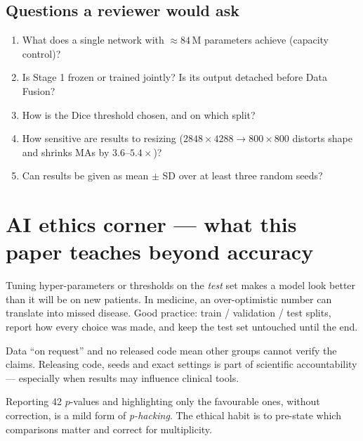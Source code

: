 \documentclass[11pt,a4paper]{article}
\begin{document}
\subsection{Questions a reviewer would ask}
\begin{enumerate}
\item What does a single network with $\approx84$\,M parameters achieve (capacity control)?
\item Is Stage 1 frozen or trained jointly? Is its output detached before Data Fusion?
\item How is the Dice threshold chosen, and on which split?
\item How sensitive are results to resizing ($2848\times4288\rightarrow800\times800$ distorts shape and
      shrinks MAs by $3.6$--$5.4\times$)?
\item Can results be given as mean $\pm$ SD over at least three random seeds?
\end{enumerate}

\section{AI ethics corner --- what this paper teaches beyond accuracy}
\begin{ethics}
Tuning hyper-parameters or thresholds on the \emph{test} set makes a model look better than it will be
on new patients. In medicine, an over-optimistic number can translate into missed disease. Good
practice: train / validation / test splits, report how every choice was made, and keep the test set
untouched until the end.
\end{ethics}

\begin{ethics}
Data ``on request'' and no released code mean other groups cannot verify the claims. Releasing code,
seeds and exact settings is part of scientific accountability --- especially when results may influence
clinical tools.
\end{ethics}

\begin{ethics}
Reporting 42 $p$-values and highlighting only the favourable ones, without correction, is a mild form
of \emph{p-hacking}. The ethical habit is to pre-state which comparisons matter and correct for
multiplicity.
\end{ethics}
\end{document}
